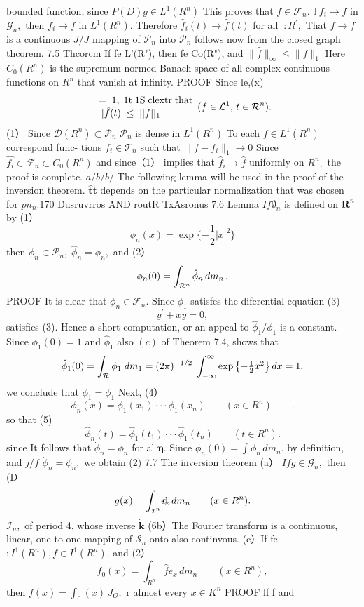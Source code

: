 bounded function, since $P(D)g\in L^{1}(R^{n})$ This proves that $f\in{\mathcal{F}}_{n}.$ $\mathbb{F}f_{i}\to f$ in ${\mathcal{G}}_{n},$ then $f_{i}\to f$ in $L^{1}(R^{n}).$ Therefore ${\hat{f}}_{i}(t)\to{\hat{f}}(t)$ for all $\ :R^{\prime},$ That $f\to f$ is a continuous $J/J$ mapping of ${\mathcal{P}}_{n}$ into ${\mathcal{P}}_{n}$ follows now from the closed graph thcorem. 7.5 Thcorcm If fe L'(R"), then fe Co(R"), and $\|{\hat{f}}\|_{\infty}\leq\|f\|_{1}$ Here $C_{0}(R^{n})$ is the supremum-normed Banach space of all complex continuous functions on $R^{n}$ that vanish at infinity. PROOF Since le,(x) $$ \begin{array}{l}{{=\;1,\;1\mathrm{t}\;\mathrm{1S}\;\mathrm{clextr}\;\mathrm{that}}}\\ {{\;|\hat{f}(t)\mid\leq\;||f||_{1}}}\end{array}(f\in{\cal L}^{1},\,t\in{\cal R}^{n}). $$ (1） Since ${\mathcal{D}}(R^{n})\subset{\mathcal{P}}_{n}$ ${\mathcal{P}}_{n}$ is dense in $L^{1}(R^{n})$ To each $f\in L^{1}(R^{n})$ correspond func- tions $f_{i}\in{\mathcal{T}}_{n}$ such that $\|f-f_{i}\|_{1}\to0$ Since ${\hat{f_{i}}}\in{\mathcal{F}}_{n}\subset C_{0}(R^{n})$ and since（1） implies that ${\hat{f}}_{i}\to{\hat{f}}$ uniformly on $R^{n},$ the proof is complctc. ${a\!\!\!/}{b\!\!\!/}{b\!\!\!/}$ The following lemma will be used in the proof of the inversion theorem. $\mathbf{{\hat{t}}t}$ depends on the particular normalization that was chosen for $p n_{n}.$170 Dusruvrros AND routR TxAsronus 7.6 Lemma $I f\emptyset_{n}$ is defined on ${\boldsymbol{R}}^{n}$ by (1） $$ \phi_{n}(x)=\exp{\{-{\frac{1}{2}}|x|^{2}\}} $$ then $\phi_{n}\subset\mathcal{P}_{n},\;\hat{\phi}_{n}=\phi_{n},$ and (2） $$ \phi_{n}(0)=\int_{{\cal R}^{n}}\hat{\phi}_{n}\,d m_{n}\,. $$ PROOF It is clear that $\phi_{n}\in{\mathcal{F}}_{n}.$ Since $\phi_{1}$ satisfes the diferential equation (3) $$ y^{\prime}+x y=0, $$ satisfies (3). Hence a short computation, or an appeal to ${\hat{\phi}}_{1}/\phi_{1}$ is a constant. Since $\phi_{1}(0)=1$ and ${\hat{\phi}}_{1}$ also $\left(c\right)$ of Theorem 7.4, shows that $$ \hat{\phi}_{1}(0)=\int_{\cal R}\phi_{1}\;d m_{1}=(2\pi)^{-1/2}\;\int_{-\infty}^{\infty}\exp\left\{-\textstyle{\frac{1}{2}}x^{2}\right\}d x=1, $$ we conclude that ${\dot{\phi}}_{1}=\phi_{1}$ Next, (4） $$ \phi_{n}(x)=\phi_{1}(x_{1})\cdot\cdot\cdot\phi_{1}(x_{n})\qquad(x\in R^{n})\qquad. $$ so that (5) $$ \hat{\phi}_{n}(t)=\hat{\phi}_{1}(t_{1})\cdot\cdot\cdot\hat{\phi}_{1}(t_{n})\qquad(t\in R^{n}). $$ since It follows that ${\dot{\phi}}_{n}=\phi_{n}$ for al ${\boldsymbol{\eta}}.$ Since $\phi_{n}(0)=\textstyle\int\phi_{n}\,d m_{n}.$ by definition, and ${j}/f$ ${\dot{\phi}}_{n}=\phi_{n},$ we obtain (2) 7.7 The inversion theorem (a） $I f g\in{\mathcal{G}}_{n},$ then (D $$ g(x)=\int_{x^{n}}\rlap{d}\!\epsilon_{x}\,d m_{n}\qquad(x\in R^{n}). $$ ${\mathcal{I}}_{n},$ of period 4, whose inverse $\dot{\boldsymbol{k}}$ (6b）The Fourier transform is a continuous, linear, one-to-one mapping of ${\mathcal{S}}_{n}$ onto also continvous. (c）If fe $:I^{1}(R^{n}),f\in I^{1}(R^{n}).$ and (2） $$ f_{0}(x)=\int_{R^{n}}{\hat{f}}e_{x}\,d m_{n}\qquad(x\in R^{n}), $$ then $f(x)=\int_{0}(x)\,J_{O},$ r almost every $x\in K^{n}$ PROOF lf f and 